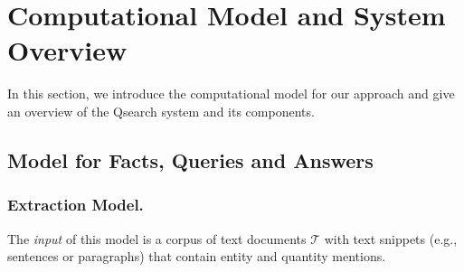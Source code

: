 \section{Computational Model and System Overview}
In this section, we introduce the computational model for our
approach and give an overview of the Qsearch system and its components.

\subsection{Model for Facts, Queries and Answers}
\label{sec:framework}







\subsubsection{Extraction Model.}
The \textit{input} of this model is a corpus of text documents $\mathcal{T}$ with text snippets (e.g., sentences or paragraphs) that contain
entity and 
quantity mentions. 

